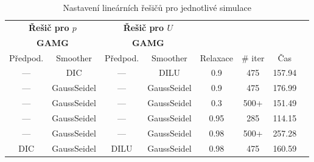 \documentclass[a4paper,12pt]{report}
\theoremstyle{remark}
\begin{document}
 \begin{table}[H]
	\centering
	\caption{Nastavení lineárních řešičů pro jednotlivé simulace}
	\renewcommand{\arraystretch}{1.9}
	\begin{tabular}{*8c}
		\toprule
		\multicolumn{2}{c}{\textbf{Řešič pro $p$}} & \multicolumn{2}{c}{\textbf{Řešič pro $U$}}\\
		\multicolumn{2}{c}{\textbf{GAMG}} & \multicolumn{2}{c}{\textbf{GAMG}}\\		
		\midrule
		Předpod.&Smoother&Předpod.&Smoother&Relaxace& \# iter&Čas\\
		
		\midrule
		
		--- & DIC & --- &  DILU & 0.9&475 &157.94\\
		
		--- & GaussSeidel &  --- & GaussSeidel & 0.9&475&176.99\\
		
		--- & GaussSeidel &  --- & GaussSeidel & 0.3&500+&151.49\\
		
		--- & GaussSeidel &  --- & GaussSeidel & 0.95&285&114.15\\
		
		--- & GaussSeidel &  --- & GaussSeidel & 0.98&500+&257.28\\
		
		DIC & GaussSeidel &  DILU & GaussSeidel & 0.98&475&160.59\\
		\bottomrule
	\end{tabular}
	
	\label{table:solvers_set1}
	
\end{table}
\end{document}
